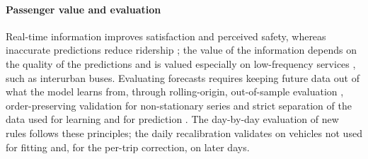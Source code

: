 \paragraph{Passenger value and evaluation} Real-time information improves satisfaction and perceived safety, whereas
inaccurate predictions reduce ridership \parencite{gooze2013benefits,brakewood2019}; the value of the information
depends on the quality of the predictions \parencite{liu2020waiting} and is valued especially on low-frequency services
\parencite{rahman2013users}, such as interurban buses. Evaluating forecasts requires keeping future data out of what
the model learns from, through rolling-origin, out-of-sample evaluation \parencite{tashman2000outofsample},
order-preserving validation for non-stationary series \parencite{cerqueira2020evaluating} and strict separation of the
data used for learning and for prediction \parencite{kaufman2012leakage}. The day-by-day evaluation of new rules
follows these principles; the daily recalibration validates on vehicles not used for fitting and, for the per-trip
correction, on later days.
